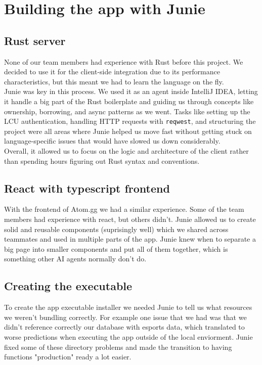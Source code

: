 \documentclass[12pt, a4paper]{article}
\begin{document}
    \section{Building the app with Junie}

    \subsection{Rust server}
    None of our team members had experience with Rust before this project. We decided to use it for the client-side integration due to its performance characteristics, but this meant we had to learn the language on the fly.
    \\
    Junie was key  in this process. We used it as an agent inside IntelliJ IDEA, letting it handle a big part of the Rust boilerplate and guiding us through concepts like ownership, borrowing, and async patterns as we went. Tasks like setting up the LCU authentication, handling HTTP requests with \texttt{reqwest}, and structuring the project were all areas where Junie helped us move fast without getting stuck on language-specific issues that would have slowed us down considerably.
    \\
    Overall, it allowed us to focus on the logic and architecture of the client rather than spending hours figuring out Rust syntax and conventions.
    \subsection{React with typescript frontend}
    With the frontend of Atom.gg we had a similar experience. Some of the team members had experience with react, but others didn't. Junie allowed us to create solid and reusable components (suprisingly well) which we shared across teammates and used in multiple parts of the app. Junie knew when to separate a big page into smaller components and put all of them together, which is something other AI agents normally don't do.
    \\
    \subsection{Creating the executable}
    To create the app executable installer we needed Junie to tell us what resources we weren't bundling correctly. For example one issue that we had was that we didn't reference correctly our database with esports data, which translated to worse predictions when executing the app outside of the local enviorment. Junie fixed some of these directory problems and made the transition to having functions "production" ready a lot easier.
\end{document}
